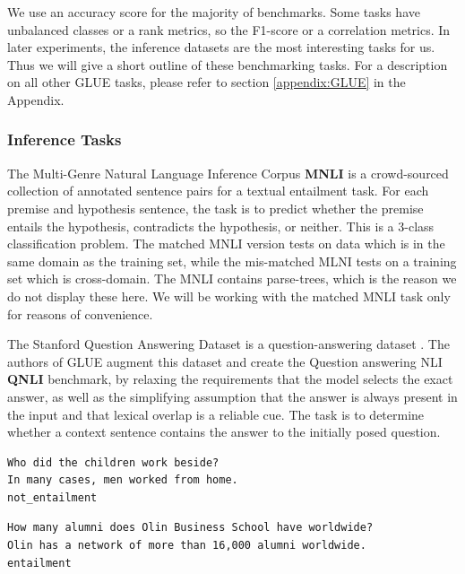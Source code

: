 \documentclass[a4paper,12pt,twoside,openright]{report}
\begin{document}
We use an accuracy score for the majority of benchmarks. 
Some tasks have unbalanced classes or a rank metrics, so the F1-score or a correlation metrics. 
In later experiments, the inference datasets are the most interesting tasks for us. 
Thus we will give a short outline of these benchmarking tasks. 
For a description on all other GLUE tasks, please refer to section \ref{appendix:GLUE} in the Appendix.

\subsubsection{Inference Tasks}

The Multi-Genre Natural Language Inference Corpus \textbf{MNLI} \cite{N18-1101} \cite{bowman2015} is a crowd-sourced collection of annotated sentence pairs for a textual entailment task.
For each premise and hypothesis sentence, the task is to predict whether the premise entails the hypothesis, contradicts the hypothesis, or neither.
This is a 3-class classification problem.
The matched MNLI version tests on data which is in the same domain as the training set, while the mis-matched MLNI tests on a training set which is cross-domain.
The MNLI contains parse-trees, which is the reason we do not display these here.
We will be working with the matched MNLI task only for reasons of convenience.

The Stanford Question Answering Dataset is a question-answering dataset \cite{rajpurkar2016}. 
The authors of GLUE augment this dataset and create the Question answering NLI \textbf{QNLI} benchmark, by relaxing the requirements that the model selects the exact answer, as well as the simplifying assumption that the answer is always present in the input and that lexical overlap is a reliable cue.
The task is to determine whether a context sentence contains the answer to the initially posed question. 

\begin{tcolorbox}
\begin{verbatim}
Who did the children work beside?	
In many cases, men worked from home.
not_entailment
\end{verbatim}
\end{tcolorbox}

\begin{tcolorbox}
\begin{verbatim}
How many alumni does Olin Business School have worldwide?
Olin has a network of more than 16,000 alumni worldwide.
entailment
\end{verbatim}
\end{tcolorbox}
\end{document}
